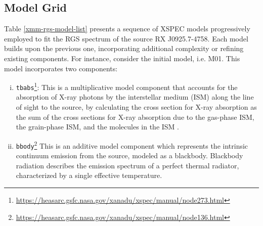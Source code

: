 		\subsection{Model Grid} \label{hi-resolution:models:grid}
			Table \ref{xmm-rgs-model-list} presents a sequence of XSPEC models progressively employed to fit the RGS spectrum of the source RX J0925.7-4758. Each model builds upon the previous one, incorporating additional complexity or refining existing components. For instance, consider the initial model, i.e. M01. This model incorporates two components:
			\begin{enumerate}[i.]
				\item \texttt{tbabs}\footnote{\url{https://heasarc.gsfc.nasa.gov/xanadu/xspec/manual/node273.html}}: This is a multiplicative model component that accounts for the absorption of X-ray photons by the interstellar medium (ISM) along the line of sight to the source, by calculating the cross section for X-ray absorption as the sum of the cross sections for X-ray absorption due to the gas-phase ISM, the grain-phase ISM, and the molecules in the ISM \cite{wilms2000tbabs}.
				
				\item \texttt{bbody}\footnote{\url{https://heasarc.gsfc.nasa.gov/xanadu/xspec/manual/node136.html}} This is an additive model component which represents the intrinsic continuum emission from the source, modeled as a blackbody. Blackbody radiation describes the emission spectrum of a perfect thermal radiator, characterized by a single effective temperature.
			\end{enumerate}
			
